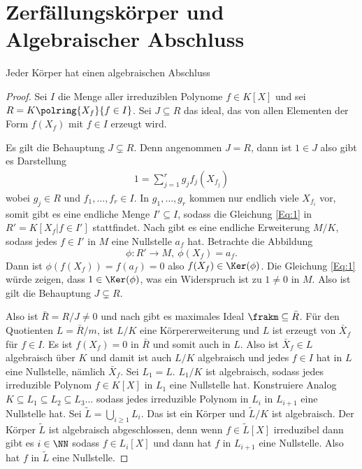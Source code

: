 \section{Zerfällungskörper und Algebraischer Abschluss}
\begin{Satz}
    Jeder Körper hat einen algebraischen Abschluss
\end{Satz}
\begin{proof}
    Sei \(I\) die Menge aller irreduziblen Polynome \(f\in K[X]\) und sei \(R=K\polring{X_f}{f\in I}\). Sei \(J\subseteq R\) das ideal, das von allen Elementen der Form \(f(X_f)\) mit \(f\in I\) erzeugt wird.
    
    Es gilt die Behauptung \(J\subsetneq R\). Denn angenommen \(J=R\), dann ist \(1\in J\) also gibt es Darstellung 
    \begin{align} 1=\sum_{j=1}^rg_jf_j(X_{f_j})\label{Eq:1}
    \end{align} wobei \(g_j\in R\) und \(f_1,\dots,f_r\in I\). In \(g_1,\dots,g_r\) kommen nur endlich viele \(X_{f_i}\) vor, somit gibt es eine endliche Menge \(I'\subseteq I\), sodass die Gleichung \ref{Eq:1} in \(R'=K[X_f| f\in I']\) stattfindet.
    Nach  gibt es eine endliche Erweiterung \(M/K\), sodass jedes \(f\in I'\) in \(M\) eine Nullstelle \(a_f\) hat. Betrachte die Abbildung \[\phi\colon R'\to M,\ \phi(X_f)=a_f.\]
    Dann ist \(\phi(f(X_f))=f(a_f)=0\) also \(f(X_f)\in \Ker(\phi)\). Die Gleichung \ref{Eq:1} würde zeigen, dass \(1\in \Ker(\phi)\), was ein Widerspruch ist zu \(1\neq 0\) in \(M\).
    Also ist gilt die Behauptung \(J\subsetneq R\).
    
    Also ist \(\bar R=R/J\neq 0\) und nach  gibt es maximales Ideal \(\frakm\subseteq \bar R\). Für den Quotienten \(L=\bar R/m\), ist \(L/K\) eine Körpererweiterung und \(L\) ist erzeugt von \(\bar X_f\) für \(f\in I\). Es ist \(f(X_f)=0\) in \(\bar R\) und somit auch in \(L\). Also ist \(\bar X_f\in L\) algebraisch über \(K\) und damit ist auch \(L/K\) algebraisch und jedes \(f\in I\) hat in \(L\) eine Nullstelle, nämlich \(\bar X_f\).
    Sei \(L_1=L\). \(L_1/K\) ist algebraisch, sodass jedes irreduzible Polynom \(f\in K[X]\) in \(L_1\) eine Nullstelle hat.
    Konstruiere Analog \(K\subseteq L_1\subseteq L_2\subseteq L_3\dots\) sodass jedes irreduzible Polynom in \(L_i\) in \(L_{i+1}\) eine Nullstelle hat. Sei \(\tilde L= \bigcup\limits_{i\geq 1}L_i\). Das ist  ein Körper und \(\tilde L/K\) ist algebraisch.
    Der Körper \(\tilde L\) ist algebraisch abgeschlossen, denn wenn \(f\in \tilde L[X]\) irreduzibel dann gibt es \(i\in\NN\) sodass \(f\in L_i[X]\) und dann hat \(f\) in \(L_{i+1}\) eine Nullstelle. Also hat \(f\) in \(\tilde L\) eine Nullstelle.
\end{proof}
